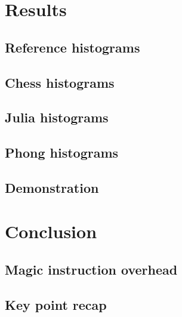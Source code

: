 \documentclass{beamer}
\begin{document}
	\section{Results}
	\subsection{Reference histograms}
	
	\subsection{Chess histograms}
	
	\subsection{Julia histograms}
	
	\subsection{Phong histograms}
	
	\subsection{Demonstration}
	

	\section{Conclusion}
	\subsection{Magic instruction overhead}
	
	\subsection{Key point recap}
	
\end{document}
